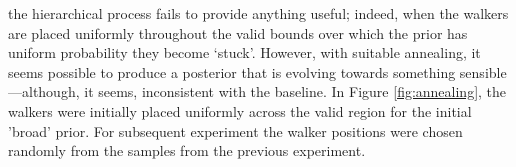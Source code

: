 \documentclass{tufte-handout}
\begin{document}
 the hierarchical process fails to
provide anything useful; indeed, when the walkers are placed uniformly
throughout the valid bounds over which the prior has uniform
probability they become `stuck'. However, with suitable annealing, it
seems possible to produce a posterior that is evolving towards
something sensible---although, it seems, inconsistent with the
baseline. In Figure \ref{fig:annealing}, the walkers were initially
placed uniformly across the valid region for the initial 'broad'
prior. For subsequent experiment the walker positions were chosen
randomly from the samples from the previous experiment.
\end{document}
